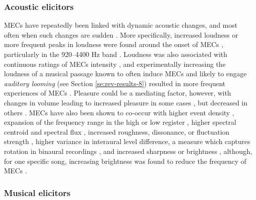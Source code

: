 \subsubsection{Acoustic elicitors}

MECs have repeatedly been linked with dynamic acoustic changes, and most often when such changes are sudden \parencite{auricchio2017, guhn2007, nagel2008, polo2017, sloboda1991}. More specifically, increased loudness or more frequent peaks in loudness were found around the onset of MECs \parencite{beier2020, grewe2007, guhn2007, honda2020, nagel2008}, particularly in the 920--4400 Hz band \parencite{nagel2008}. Loudness was also associated with continuous ratings of MECs intensity \parencite{bannister2018}, and experimentally increasing the loudness of a musical passage known to often induce MECs and likely to engage \emph{auditory looming} (see Section \ref{se:rev-results-8}) resulted in more frequent experiences of MECs \parencite{bannister2020b}. Pleasure could be a mediating factor, however, with changes in volume leading to increased pleasure in some cases \parencite{grewe2007}, but decreased in others \parencite{bannister2020b}. MECs have also been shown to co-occur with higher event density \parencite{bannister2018, nagel2008, polo2017}, expansion of the frequency range in the high or low register \parencite{guhn2007, polo2017}, higher spectral centroid and spectral flux \parencite{bannister2018}, increased roughness, dissonance, or fluctuation strength \parencite{bannister2018, beier2020, grewe2007, nagel2008, park2019}, higher variance in interaural level difference, a measure which captures rotation in binaural recordings \parencite{honda2020}, and increased sharpness or brightness \parencite{bannister2018, beier2020, grewe2007, honda2020}, although, for one specific song, increasing brightness was found to reduce the frequency of MECs \parencite{bannister2020b}.

\subsubsection{Musical elicitors}


